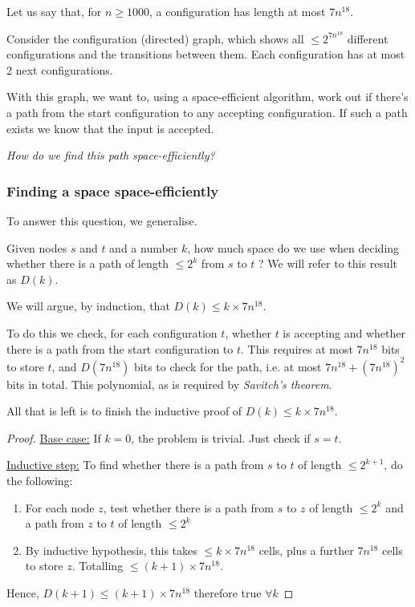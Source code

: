 \documentclass{article}
\begin{document}
Let us say that, for $n \geq 1000$, a configuration has length at most $7n^{18}$.

Consider the configuration (directed) graph, which shows all $\leq 2^{7n^{18}}$ different configurations and the transitions between them. Each configuration has at most 2 next configurations.

With this graph, we want to, using a space-efficient algorithm, work out if there's a path from the start configuration to any accepting configuration. If such a path exists we know that the input is accepted.

\textit{How do we find this path space-efficiently?}


\subsubsection{Finding a space space-efficiently}

To answer this question, we generalise.

Given nodes $s$ and $t$ and a number $k$, how much space do we use when deciding whether there is a path of length $\leq 2^{k}$ from $s$ to $t$ ? We will refer to this result as $D(k)$.

We will argue, by induction, that $D(k) \leq k \times 7n^{18}$.

To do this we check, for each configuration $t$, whether $t$ is accepting and whether there is a path from the start configuration to $t$. This requires at most $7n^{18}$ bits to store $t$, and $D(7n^{18})$ bits to check for the path, i.e. at most $7n^{18} +  (7n^{18})^{2}$ bits in total. This polynomial, as is required by \textit{Savitch's theorem}.

All that is left is to finish the inductive proof of $D(k) \leq k \times 7n^{18}$.
\begin{proof}

\underline{Base case:} If $k=0$, the problem is trivial. Just check if $s=t$.

\underline{Inductive step:} To find whether there is a path from $s$ to $t$ of length $\leq 2^{k+1}$, do the following:
\begin{enumerate}
  \item For each node $z$, test whether there is a path from $s$ to $z$ of length $\leq 2^{k}$ and a path from $z$ to $t$ of length $\leq 2^{k}$
  \item By inductive hypothesis, this takes $\leq k \times 7n^{18}$ cells, plus a further $7n^{18}$ cells to store $z$. Totalling $\leq (k+1) \times 7n^{18}$.

\end{enumerate}

Hence, $D(k+1) \leq (k+1) \times 7n^{18}$ therefore true $\forall k$
\end{proof}
\end{document}
